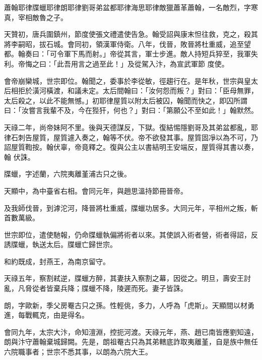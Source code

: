 
\begin{pinyinscope}

 蕭翰耶律牒蠟耶律朗耶律劉哥弟盆都耶律海思耶律敵獵蕭革蕭翰，一名敵烈，字寒真，宰相敵魯之子。



 天贊初，唐兵圍鎮州，節度使張文禮遣使告急。翰受詔與康末怛往救，克之，殺其將李嗣昭，拔石城。會同初，領漢軍侍衛。八年，伐晉，敗晉將杜重威，追至望都。翰奏曰：「可令軍下馬而射。」帝從其言，軍士步進。敵人持短兵猝至，我軍失利。帝悔之曰：「此吾用言之過至此！」及從駕入汴，為宣武軍節
 度使。



 會帝崩欒城，世宗即位。翰聞之，委事於李從敏，徑趨行在。是年秋，世宗與皇太后相拒於潢河橫渡，和議未定。太后間翰曰：「汝何怨而叛？」對曰：「臣母無罪，太后殺之，以此不能無憾。」初耶律屋質以附太后被囚，翰聞而快之，即囚所謂曰：「汝嘗言我輩不及，今在狴犴，何也？」對曰：「第願公不至如此！」翰默然。



 天祿二年，尚帝妹阿不里。後與天德謀反，下獄。復結惕隱劉哥及其弟盆都亂，耶律石刺告屋質，屋質遽入奏之，翰等不伏。帝不欲發其事。屋質固凈以為不可，乃詔屋質鞫按。翰伏辜，帝竟釋之。復與公主以書結明王安端反，屋質得其書以奏，翰
 伏誅。



 牒蠟，字述蘭，六院夷離堇浦古只之後。



 天顯中，為中臺省右相。會同元年，與趙思溫持節冊晉帝。



 及我師伐晉，到滹沱河，降晉將杜重威，牒蠟功居多。大同元年，平相州之叛，斬首數萬級。



 世宗即位，遣使馳報，仍命牒蠟執偏將術者以來。其使誤入術者營，術者得詔，反誘牒蠟，執送太后。牒蠟亡歸世宗。



 和約既成，封燕王，為南京留守。



 天祿五年，察割弒逆，牒蠟方醉，其妻扶入察割之幕，因從之。明旦，壽安王討亂，凡脅從者皆棄兵降；牒蠟不降，陵遲而死。妻子皆誅。



 朗，字歐新，季父房罨古只之孫。性輕佻，多力，人呼為「虎斯」。天顯間以材勇進，每戰輒克，由是得名。



 會同九年，太宗大汴，命知澶淵，控扼河渡。天祿元年，燕、趙已南皆應劉知遠，朗與汴守蕭翰棄城歸闕。先是，朗祖罨古只為其弟轄底詐取夷離堇，自是族中無任六院職事者；世宗不悉其事，以朗為六院大王。




\end{pinyinscope}
